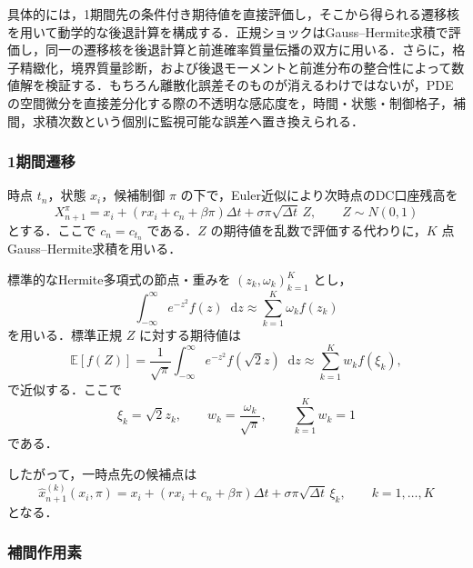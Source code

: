 \documentclass[10pt,a4paper]{article}
\theoremstyle{plain}
\theoremstyle{definition}
\newcommand{\E}{\mathbb{E}}
\newcommand{\dd}{\mathop{}\!\mathrm{d}}
\begin{document}
具体的には，1期間先の条件付き期待値を直接評価し，そこから得られる遷移核を用いて動学的な後退計算を構成する．正規ショックはGauss--Hermite求積で評価し，同一の遷移核を後退計算と前進確率質量伝播の双方に用いる．さらに，格子精緻化，境界質量診断，および後退モーメントと前進分布の整合性によって数値解を検証する．もちろん離散化誤差そのものが消えるわけではないが，PDEの空間微分を直接差分化する際の不透明な感応度を，時間・状態・制御格子，補間，求積次数という個別に監視可能な誤差へ置き換えられる．

\subsubsection{1期間遷移}

時点 $t_n$，状態 $x_i$，候補制御 $\pi$ の下で，Euler近似により次時点のDC口座残高を
\begin{equation}
  X_{n+1}^{\pi}
  =x_i+(rx_i+c_n+\beta\pi)\Delta t+\sigma\pi\sqrt{\Delta t}\,Z,
  \qquad Z\sim N(0,1)
  \label{eq:euler-transition}
\end{equation}
とする．ここで $c_n=c_{t_n}$ である．$Z$ の期待値を乱数で評価する代わりに，$K$ 点Gauss--Hermite求積を用いる．

標準的なHermite多項式の節点・重みを $(z_k,\omega_k)_{k=1}^K$ とし，
\begin{equation}
  \int_{-\infty}^{\infty} e^{-z^2}f(z)\dd z
  \approx
  \sum_{k=1}^K\omega_k f(z_k)
  \label{eq:gh-basic}
\end{equation}
を用いる．標準正規 $Z$ に対する期待値は
\begin{equation}
  \E[f(Z)]
  =\frac{1}{\sqrt{\pi}}\int_{-\infty}^{\infty}e^{-z^2}f(\sqrt{2}z)\dd z
  \approx
  \sum_{k=1}^K w_k f(\xi_k),
  \label{eq:gh-normal}
\end{equation}
で近似する．ここで
\begin{equation}
  \xi_k=\sqrt{2}z_k,
  \qquad
  w_k=\frac{\omega_k}{\sqrt{\pi}},
  \qquad
  \sum_{k=1}^K w_k=1
  \label{eq:gh-nodes}
\end{equation}
である．

したがって，一時点先の候補点は
\begin{equation}
  \widehat{x}_{n+1}^{(k)}(x_i,\pi)
  =x_i+(rx_i+c_n+\beta\pi)\Delta t
  +\sigma\pi\sqrt{\Delta t}\,\xi_k,
  \qquad k=1,\ldots,K
  \label{eq:transition-gh-nodes}
\end{equation}
となる．

\subsubsection{補間作用素}
\end{document}
